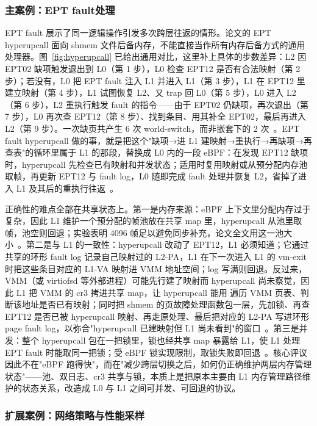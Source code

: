 \subsubsection{主案例：EPT fault处理}\label{sec:nested-ht-ept}

EPT fault 展示了同一逻辑操作引发多次跨层往返的情形。论文的 EPT hyperupcall 面向 shmem 文件后备内存，不能直接当作所有内存后备方式的通用处理器。图~\ref{fig:hyperupcall} 已给出通用对比，这里补上具体的步数差异：L2 因 EPT02 缺项触发退出到 L0（第 1 步），L0 检查 EPT12 是否有合法映射（第 2 步）；若没有，L0 把 EPT fault 注入 L1 并进入 L1（第 3 步），L1 在 EPT12 里建立映射（第 4 步），L1 试图恢复 L2、又 trap 回 L0（第 5 步），L0 进入 L2（第 6 步），L2 重执行触发 fault 的指令——由于 EPT02 仍缺项，再次退出（第 7 步），L0 再次查 EPT12（第 8 步）、找到条目、用其补全 EPT02，最后再进入 L2（第 9 步）。一次缺页共产生 6 次 world-switch，而非嵌套下的 2 次~\cite{source8}。EPT fault hyperupcall 做的事，就是把这个"缺项→进 L1 建映射→重执行→再缺项→再查表"的循环里属于 L1 的那段，替换成 L0 内的一段 eBPF：在发现 EPT12 缺项时，hyperupcall 先检查已有映射和并发状态；适用时复用映射或从预分配内存池取帧，再更新 EPT12 与 fault log，L0 随即完成 fault 处理并恢复 L2，省掉了进入 L1 及其后的重执行往返~\cite{source8}。

正确性的难点全部在共享状态上。第一是内存来源：eBPF 上下文里分配内存过于复杂，因此 L1 维护一个预分配的帧池放在共享 map 里，hyperupcall 从池里取帧，池空则回退；实验表明 4096 帧足以避免同步补充，论文全文用这一池大小~\cite{source8}。第二是与 L1 的一致性：hyperupcall 改动了 EPT12，L1 必须知道；它通过共享的环形 fault log 记录自己映射过的 L2-PA，L1 在下一次进入 L1 的 vm-exit 时把这些条目对应的 L1-VA 映射进 VMM 地址空间；log 写满则回退。反过来，VMM（或 virtiofsd 等外部进程）可能先行建了映射而 hyperupcall 尚未察觉，因此 L1 把 VMM 的 cr3 拷进共享 map，让 hyperupcall 能用  遍历 VMM 页表、判断该地址是否已有映射；同时把 shmem 的页故障处理函数包一层，先加锁、再查 EPT12 是否已被 hyperupcall 映射、再走原处理、最后把对应的 L2-PA 写进环形 page fault log，以弥合"hyperupcall 已建映射但 L1 尚未看到"的窗口~\cite{source8}。第三是并发：整个 hyperupcall 包在一把锁里，锁也经共享 map 暴露给 L1，使 L1 处理 EPT fault 时能取同一把锁；受 eBPF 锁实现限制，取锁失败即回退~\cite{source8}。核心评议因此不在"eBPF 跑得快"，而在"减少跨层切换之后，如何仍正确维护两层内存管理状态"——池、双日志、cr3 共享与锁，本质上是把原本主要由 L1 内存管理路径维护的状态关系，改造成 L0 与 L1 之间可并发、可回退的协议。

\subsubsection{扩展案例：网络策略与性能采样}\label{sec:nested-ht-net-prof}

